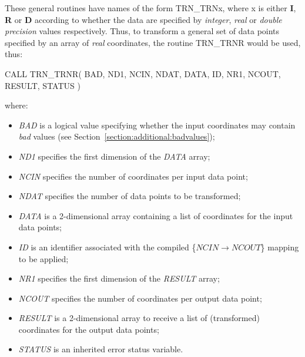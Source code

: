 \documentclass[twoside,nolof,11pt]{starlink}
\providecommand{\name}[1]{\small{#1}}
\providecommand{\fortvar}[1]{\emph{#1}}
\begin{document}
These general routines have names of the form \name{TRN\_TRNx}, where x is
either \textbf{I}, \textbf{R} or \textbf{D} according to whether the data are
specified by \emph{integer}, \emph{real} or \emph{double precision} values
respectively.
Thus, to transform a general set of data points specified by an array of
\emph{real} coordinates, the routine \name{TRN\_TRNR} would be used, thus:

\begin{terminalv}
CALL TRN_TRNR( BAD, ND1, NCIN, NDAT, DATA, ID, NR1, NCOUT, RESULT, STATUS )
\end{terminalv}

where:

\begin{itemize}

\item \fortvar{BAD} is a logical value specifying whether the input
coordinates may contain \emph{bad} values (see
Section~\ref{section:additional:badvalues});

\item \fortvar{ND1} specifies the first dimension of the \fortvar{DATA}
array;

\item \fortvar{NCIN} specifies the number of coordinates per input data
point;

\item \fortvar{NDAT} specifies the number of data points to be transformed;

\item \fortvar{DATA} is a 2-dimensional array containing a list of
coordinates for the input data points;

\item \fortvar{ID} is an identifier associated with the compiled
\mbox{\{$NCIN \rightarrow NCOUT$\}} mapping to be applied;

\item \fortvar{NR1} specifies the first dimension of the \fortvar{RESULT}
array;

\item \fortvar{NCOUT} specifies the number of coordinates per output data
point;

\item \fortvar{RESULT} is a 2-dimensional array to receive a list of
(transformed) coordinates for the output data points;

\item \fortvar{STATUS} is an inherited error status variable.

\end{itemize}
\end{document}
